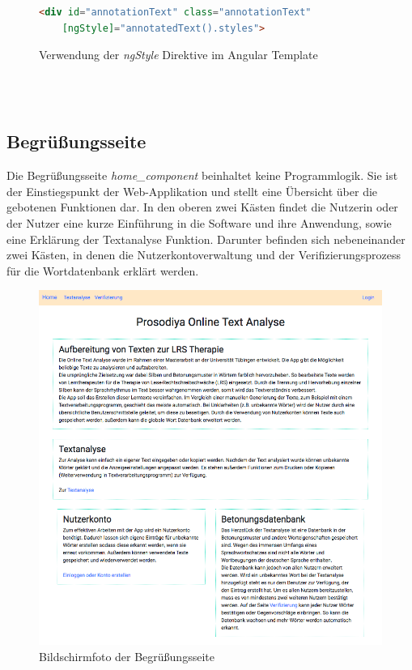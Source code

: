 \begin{figure}[h!]
\centering
\begin{lstlisting}[language=HTML, frame=single]
<div id="annotationText" class="annotationText"
	[ngStyle]="annotatedText().styles">
\end{lstlisting}
\caption{Verwendung der \textit{ngStyle} Direktive im Angular Template}
\end{figure}




\\
\\




\subsection{Begrüßungsseite}

Die Begrüßungsseite \textit{home\_component} beinhaltet keine Programmlogik. Sie ist der Einstiegspunkt der Web-Applikation und stellt eine Übersicht über die gebotenen Funktionen dar. In den oberen zwei Kästen findet die Nutzerin oder der Nutzer eine kurze Einführung in die Software und ihre Anwendung, sowie eine Erklärung der Textanalyse Funktion. Darunter befinden sich nebeneinander zwei Kästen, in denen die Nutzerkontoverwaltung und der Verifizierungsprozess für die Wortdatenbank erklärt werden.

\begin{figure}[h!]
	\centering
	\includegraphics[width=.6\linewidth, frame]{figures/frontend/home}
	\caption{Bildschirmfoto der Begrüßungsseite}
	\label{fig:frontend-home}
\end{figure}

